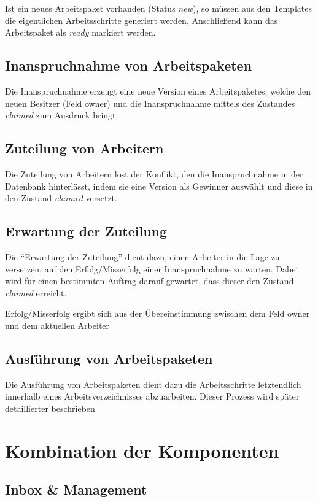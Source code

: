 Ist ein neues Arbeitspaket vorhanden (Status \textit{new}), so müssen aus den Templates die eigentlichen Arbeitsschritte generiert werden,
Anschließend kann das Arbeitspaket als \textit{ready} markiert werden.

\subsection{Inanspruchnahme von Arbeitspaketen}

Die Inanspruchnahme erzeugt eine neue Version eines Arbeitspaketes,
welche den neuen Besitzer (Feld owner) und die Inanspruchnahme mittels des Zustandes \textit{claimed}
zum Ausdruck bringt.

\subsection{Zuteilung von Arbeitern}
Die Zuteilung von Arbeitern löst der Konflikt,
den die Inanspruchnahme in der Datenbank hinterlässt,
indem sie eine Version als Gewinner auswählt und
diese in den Zustand \textit{claimed} versetzt.

\subsection{Erwartung der Zuteilung}

Die ``Erwartung der Zuteilung'' dient dazu,
einen Arbeiter in die Lage zu versetzen,
auf den Erfolg/Misserfolg einer Inanspruchnahme zu warten.
Dabei wird für einen bestimmten Auftrag darauf gewartet,
dass dieser den Zustand \textit{claimed} erreicht.

Erfolg/Misserfolg ergibt sich aus der Übereinstimmung zwischen dem Feld owner und dem aktuellen Arbeiter

\subsection{Ausführung von Arbeitspaketen}

Die Ausführung von Arbeitspaketen dient dazu die Arbeitsschritte letztendlich innerhalb eines Arbeitsverzeichnisses abzuarbeiten.
Dieser Prozess wird später detaillierter beschrieben


\section{Kombination der Komponenten}
\subsection{Inbox \& Management}

